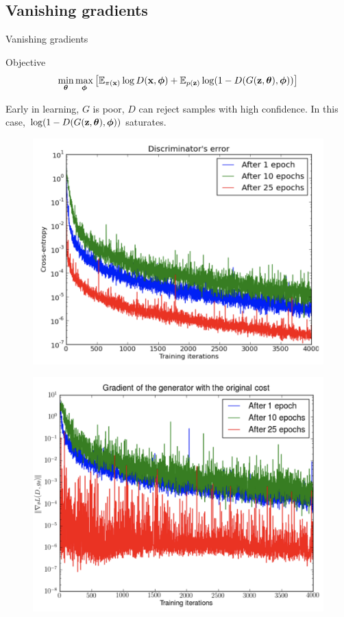 \documentclass{beamer}
\begin{document}
\subsection{Vanishing gradients}
\begin{frame}{Vanishing gradients}
	\vspace{-0.2cm}
	\begin{block}{Objective}
		\vspace{-0.8cm}
		\[
		\min_{\boldsymbol{\theta}} \max_{\boldsymbol{\phi}} \left[ \mathbb{E}_{\pi(\mathbf{x})} \log D(\mathbf{x}, \boldsymbol{\phi}) + \mathbb{E}_{p(\mathbf{z})} \log (1 - D(G(\mathbf{z}, \boldsymbol{\theta}), \boldsymbol{\phi})) \right]
		\]
		\vspace{-0.6cm}
	\end{block}
	Early in learning, $G$ is poor, $D$ can reject samples with high confidence. In this case, $\log (1 - D(G(\mathbf{z}, \boldsymbol{\theta}), \boldsymbol{\phi}))$ saturates.
	\begin{minipage}[t]{0.5\columnwidth}
		\begin{figure}
			\centering
			\includegraphics[width=0.9\linewidth]{figs/vanishing_gradients_1}
		\end{figure}
	\end{minipage}%
	\begin{minipage}[t]{0.5\columnwidth}
		\begin{figure}
			\centering
			\includegraphics[width=0.9\linewidth]{figs/vanishing_gradients_2}

\end{figure}
\end{minipage}
\end{frame}
\end{document}
